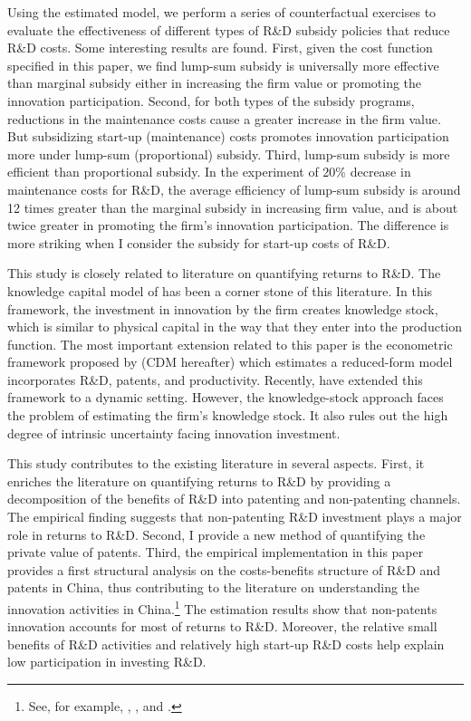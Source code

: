 \documentclass[English]{article}
\begin{document}
Using the estimated model, we perform a series of counterfactual exercises to evaluate the effectiveness of different types of R\&D subsidy policies that reduce R\&D costs. Some interesting results are found. First, given the cost function specified in this paper, we find lump-sum subsidy is universally more effective than marginal subsidy either in increasing the firm value or promoting the innovation participation. Second, for both types of the subsidy programs, reductions in the maintenance costs cause a greater increase in the firm value. But subsidizing start-up (maintenance) costs promotes innovation participation more under lump-sum (proportional) subsidy. Third, lump-sum subsidy is more efficient than proportional subsidy. In the experiment of 20\% decrease in maintenance costs for R\&D, the average efficiency of lump-sum subsidy is around 12 times greater than the marginal subsidy in increasing firm value, and is about twice greater in promoting the firm's innovation participation. The difference is more striking when I consider the subsidy for start-up costs of R\&D. 

This study is closely related to literature on quantifying returns to R\&D. The knowledge capital model of \citet{griliches1979issues} has been a corner stone of this literature. In this framework, the investment in innovation by the firm creates knowledge stock, which is similar to physical capital in the way that they enter into the production function. The most important extension related to this paper is the econometric framework proposed by \citet*{crepon1998research} (CDM hereafter) which estimates a reduced-form model incorporates R\&D, patents, and productivity. Recently, \citet*{raymond2015} have extended this  framework to a dynamic setting. However, the knowledge-stock approach faces the problem of estimating the firm's knowledge stock. It also rules out the high degree of intrinsic  uncertainty facing innovation investment. 

This study contributes to the existing literature in several aspects. First, it enriches the literature on quantifying returns to R\&D by providing a decomposition of the benefits of R\&D into patenting and non-patenting channels. The empirical finding suggests that non-patenting R\&D investment plays a major role in returns to R\&D. Second, I provide a new method of quantifying the private value of patents. Third, the empirical implementation in this paper provides a first structural analysis on the costs-benefits structure of R\&D and patents in China, thus contributing to the literature on understanding the innovation activities in China.\footnote{See, for example, \cite{Hu2009}, \cite{Hu2017}, and \cite{chen2017}.} The estimation results show that non-patents innovation accounts for most of returns to R\&D. Moreover, the relative small benefits of R\&D activities and relatively high start-up R\&D costs help explain low participation in investing R\&D. 
\end{document}
